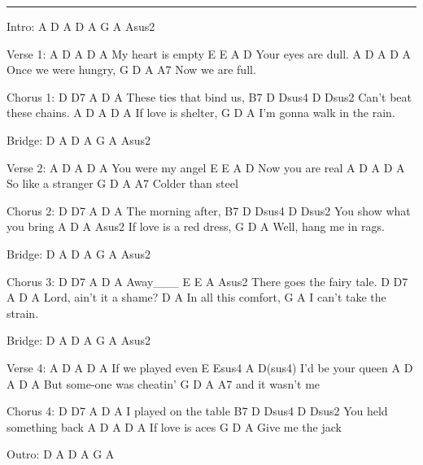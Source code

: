 \noindent\rule{\columnwidth}{1pt}

\begin{multicols}{2}
\begin{lstsong}
Intro: A  D   A   D   A   G   A  Asus2

Verse 1:
A   D         A     D  A       
My heart is empty
E     E        A    D
Your eyes are dull.
A     D       A      D  A
Once we were hungry,
G  D            A      A7
    Now we are full.

Chorus 1:
D      D7        A       D  A    
These ties that bind us,
B7                   D  Dsus4 D Dsus2
  Can't beat these chains.
A    D        A      D  A
 If  love is shelter,
G             D           A
   I'm gonna walk in the rain.

Bridge: D   A   D   A   G   A  Asus2

Verse 2:
A   D        A    D  A
You were my angel
E      E     A     D
Now you are real
   A    D   A     D  A
So like a stranger
G    D           A     A7
     Colder than steel

Chorus 2:
D     D7       A    D  A
The   morning after,
B7                  D  Dsus4  D  Dsus2
  You show what you bring
A    D         A          Asus2
 If  love is a red dress,
G         D           A
    Well, hang me in rags.






Bridge: D   A   D   A   G   A  Asus2

Chorus 3:
D   D7      A   D  A
Away___
E              E      A   Asus2
There goes the fairy tale.
D      D7         A    D  A
Lord, ain't it a shame?
D             A
In all this comfort,
G                A
I can't take the strain.

Bridge: D   A   D   A   G   A  Asus2

Verse 4:
A   D         A     D A
If  we played even
E     Esus4    A     D(sus4)
I'd  be your  queen
A       D         A        D A
But some-one was cheatin'
G     D         A   A7
  and it wasn't me

Chorus 4:
D   D7           A      D A
I played on the table
B7                   D  Dsus4 D Dsus2
  You held something back
A   D       A    D  A
 If love is aces
G  D           A
   Give me the jack

Outro: D   A   D   A   G   A
\end{lstsong}
\end{multicols}
\newpage

